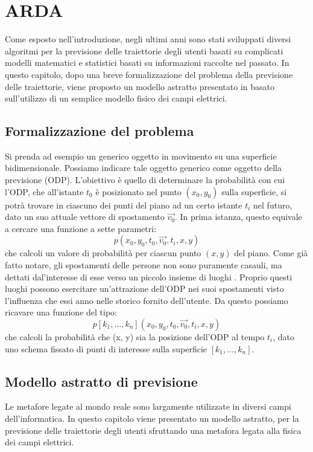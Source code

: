 \section{ARDA}
Come esposto nell'introduzione, negli ultimi anni sono stati sviluppati diversi
algoritmi per la previsione delle traiettorie degli utenti basati su complicati
modelli matematici e statistici basati su informazioni raccolte nel passato. In
questo capitolo, dopo una breve formalizzazione del problema della previsione
delle traiettorie, viene proposto un modello astratto presentato in \cite{cit_49}
basato sull'utilizzo di un semplice modello fisico dei campi elettrici.

\subsection{Formalizzazione del problema}
Si prenda ad esempio un generico oggetto in movimento su una superficie
bidimensionale. Possiamo indicare tale oggetto generico come oggetto della previsione
(ODP). L'obiettivo \`e quello di determinare la probabilit\`a con cui l'ODP,
che all'istante $t_{0}$ \`e posizionato nel punto $(x_{0}, y_{0})$ sulla superficie,
si potr\`a trovare in ciascuno dei punti del piano ad un certo istante $t_{i}$ nel futuro,
dato un suo attuale vettore di spostamento $\vec{v_{0}}$.
In prima istanza, questo equivale a cercare una funzione a sette parametri:
\begin{equation}
p(x_{0},y_{0},t_{0},\vec{v_{0}},t_{i},x,y)
\end{equation}
che calcoli un valore di probabilit\`a per ciascun punto $(x, y)$ del piano.
Come gi\`a fatto notare, gli spostamenti delle persone non sono puramente casauli,
ma dettati dal'interesse di esse verso un piccolo insieme di luoghi \cite{cit_44}.
Proprio questi luoghi possono esercitare un'attrazione dell'ODP nei suoi spostamenti
visto l'influenza che essi anno nelle storico fornito dell'utente.
Da questo possiamo ricavare una funzione del tipo:
\begin{equation}
p[k_{1},\dots,k_{n}](x_{0},y_{0},t_{0},\vec{v_{0}},t_{i},x,y)
\end{equation}
che calcoli la probabilit\`a che (x, y) sia la posizione dell'ODP al tempo $t_{i}$,
dato uno schema fissato di punti di interesse sulla superficie $[k_{1},\dots,k_{n}]$.

\subsection{Modello astratto di previsione}
Le metafore legate al mondo reale sono largamente utilizzate in diversi campi
dell'informatica. In questo capitolo viene presentato un modello astratto,
per la previsione delle traiettorie degli utenti sfruttando una
metafora legata alla fisica dei campi elettrici.

